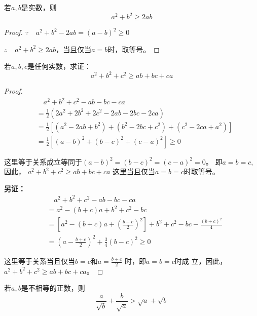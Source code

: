\begin{example}
    若$a,b$是实数，则
    \begin{equation}
        a^2+b^2\ge 2ab
    \end{equation}
\end{example}
\begin{proof}
    $\because\quad a^2+b^2-2ab=(a-b)^2\ge 0$

    $\therefore\quad a^2+b^2\ge 2ab$，当且仅当$a=b$时，取等号。
\end{proof}

    
\begin{example}
    若$a,b,c$是任何实数，求证：
    \begin{equation}
   a^2+b^2+c^2\ge ab+bc+ca     
    \end{equation}
\end{example}

\begin{proof}
    \[\begin{split}
     &\quad   a^2+b^2+c^2-ab-bc-ca \\
      &=\frac{1}{2}( 2a^2+2b^2+2c^2-2ab-2bc-2ca)\\
        &=\frac{1}{2}\left[(a^2-2ab+b^2)+(b^2-2bc+c^2)+(c^2-2ca+a^2)\right]\\
        &=\frac{1}{2}\left[(a-b)^2+(b-c)^2+(c-a)^2\right]\ge 0
    \end{split}\]
   
    这里等于关系成立等同于$(a-b)^2=(b-c)^2=(c-a)^2=0$。
    即$a=b=c$, 因此，
$a^2+b^2+c^2\ge ab+bc+ca $
这里当且仅当$a=b=c$时取等号。

\textbf{另证：} 
\[\begin{split}
    &\quad   a^2+b^2+c^2-ab-bc-ca \\
&=a^2-(b+c)a+b^2+c^2-bc\\
&=\left[a^2-(b+c)a+\left(\frac{b+c}{2}\right)^2\right]+b^2+c^2-bc-\frac{(b+c)^2}{4}\\
&=\left(a-\frac{b+c}{2}\right)^2+\frac{3}{4}(b-c)^2\ge 0
\end{split}\]

这里等于关系当且仅当$b=c$和$a=\frac{b+c}{2}$
时，即$a=b=c$时成
立，因此，
$a^2+b^2+c^2\ge ab+bc+ca $。
\end{proof}




\begin{example}
    若$a,b$是不相等的正数，则
\[\frac{a}{\sqrt{b}}+\frac{b}{\sqrt{a}}>\sqrt{a}+\sqrt{b}\]
\end{example}
    
